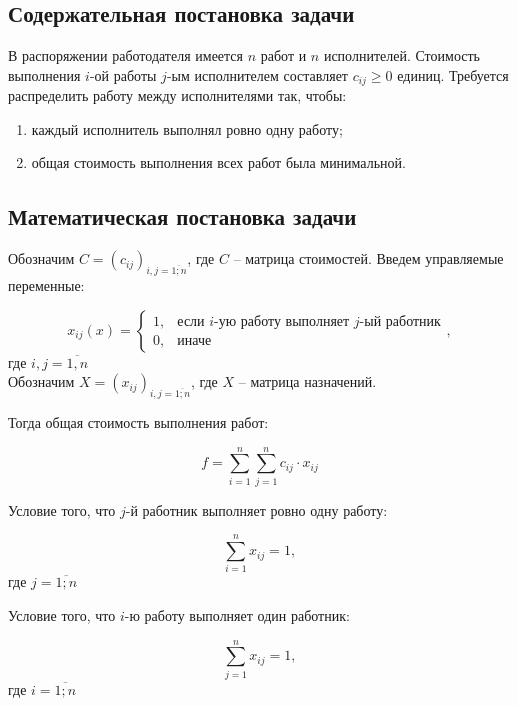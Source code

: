 \documentclass[a4paper,14pt]{article}
\begin{document}
\subsection{Содержательная постановка задачи}

В распоряжении работодателя имеется $n$ работ и $n$ исполнителей. Стоимость выполнения $i$-ой работы $j$-ым исполнителем составляет $c_{ij} \geq 0$ единиц. Требуется распределить работу между исполнителями так, чтобы:
\begin{enumerate}
\item каждый исполнитель выполнял ровно одну работу;
\item общая стоимость выполнения всех работ была минимальной.
\end{enumerate}

\subsection{Математическая постановка задачи}

Обозначим $C=(c_{ij})_{i,j = \overline{1;n}}$, где $C$ -- матрица стоимостей.
Введем управляемые переменные:

\begin{equation}
x_{ij}(x) =
 \begin{cases}
   1, &\text{если $i$-ую работу выполняет $j$-ый работник}
   \\
   0, &\text{иначе}
 \end{cases},  
\end{equation}
где $i,j = \overline{1,n}$\\

Обозначим $X=(x_{ij})_{i,j = \overline{1;n}}$, где $X$ -- матрица назначений.

Тогда общая стоимость выполнения работ:

\begin{equation}
f=\sum\limits_{i=1}^n\sum\limits_{j=1}^n c_{ij} \cdot x_{ij}
\end{equation}

Условие того, что $j$-й работник выполняет ровно одну работу:

\begin{equation}
\sum\limits_{i=1}^n x_{ij} = 1,
\end{equation}
где $j = \overline{1;n}$

Условие того, что $i$-ю работу выполняет один работник:

\begin{equation}
\sum\limits_{j=1}^n x_{ij} = 1,
\end{equation}
где $i = \overline{1;n}$
\end{document}
